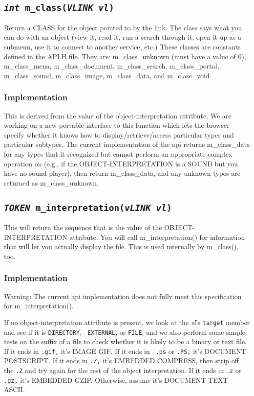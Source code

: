 \subsection{\tt {\it int} m\_class({\it VLINK vl})}

Return a CLASS for the object pointed to by the link.  The class says
what you can do with an object (view it, read it, run a search through
it, open it up as a submenu, use it to connect to another service, etc.)  These classes are constants defined
in the API.H file.  They are:    {\sc m\_class\_unknown} (must have a
value of 0), {\sc m\_class\_menu, m\_class\_document, m\_class\_search,
m\_class\_portal, m\_class\_sound, m\_class\_image, m\_class\_data,
and m\_class\_void}. 


\subsubsection{Implementation}

This is derived from the value of the {\sc object-interpretation}
attribute.  We are working on a new portable interface to this
function which lets the browser specify whether it knows how to
display/retrieve/access particular types and particular subtypes.  The
current implementation of the api returns {\sc m\_class\_data} for
any types that it recognized but cannot perform an appropriate complex
operation on (e.g., if the OBJECT-INTERPRETATION is a SOUND but you
have no sound player), then return {\sc m\_class\_data}, and any
unknown types are returned as {\sc m\_class\_unknown}.

\subsection{\tt {\it TOKEN} m\_interpretation({\it vLINK vl})}

This will return the sequence that is the value of the
OBJECT-INTERPRETATION attribute.  You will call m\_interpretation() for
information that will let you actually display the file.  This is used
internally by m\_class(), too.  

\subsubsection{Implementation}

Warning: The current api implementation does not fully meet this specification
for m\_interpretation().

If no {\sc object-interpretation} attribute is present, we look at the
{\it vl}'s {\tt target} member and see if it is {\tt DIRECTORY}, {\tt
EXTERNAL}, or {\tt FILE}, and we also perform some simple tests on the
suffix of a file to check whether it is likely to be a binary or text
file.  If it ends in {\tt .gif,} it's IMAGE GIF.  If it ends in {\tt
.ps} or {\tt .PS,} it's DOCUMENT POSTSCRIPT.  If it ends in {\tt .Z,}
it's EMBEDDED COMPRESS, then strip off the {\tt .Z} and try again for
the rest of the object interpretation.  If it ends in {\tt .z} or {\tt
.gz,} it's EMBEDDED GZIP.  Otherwise, assume it's DOCUMENT TEXT ASCII.

